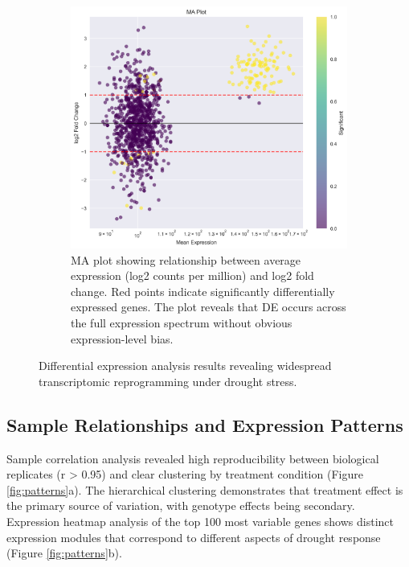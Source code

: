 \documentclass[11pt,a4paper]{article}
\begin{document}
\begin{figure}[H]
\begin{subfigure}[b]{0.48\textwidth}
        \includegraphics[width=\textwidth]{figures/ma_plot.png}
        \caption{MA plot showing relationship between average expression (log2 counts per million) and log2 fold change. Red points indicate significantly differentially expressed genes. The plot reveals that DE occurs across the full expression spectrum without obvious expression-level bias.}
        \label{fig:ma_plot}
    \end{subfigure}
    \caption{Differential expression analysis results revealing widespread transcriptomic reprogramming under drought stress.}
    \label{fig:de_analysis}
\end{figure}

\subsection{Sample Relationships and Expression Patterns}

Sample correlation analysis revealed high reproducibility between biological replicates (r > 0.95) and clear clustering by treatment condition (Figure \ref{fig:patterns}a). The hierarchical clustering demonstrates that treatment effect is the primary source of variation, with genotype effects being secondary. Expression heatmap analysis of the top 100 most variable genes shows distinct expression modules that correspond to different aspects of drought response (Figure \ref{fig:patterns}b).
\end{document}
